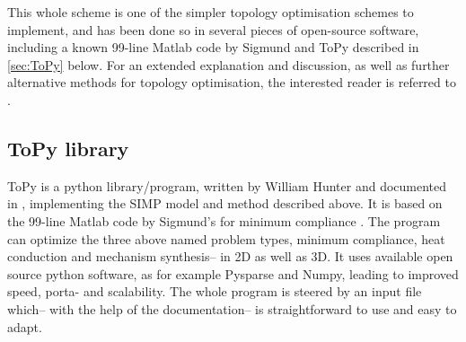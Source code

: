 This whole scheme is one of the simpler topology optimisation schemes to implement, and has been done so in several pieces of open-source software, including a known 99-line Matlab code by Sigmund \cite{sigmund200199}and ToPy described in \autoref{sec:ToPy} below. For an extended explanation and discussion, as well as further alternative methods for topology optimisation, the interested reader is referred to \cite{bendsoe2003topology}.



\subsection{ToPy library}\label{sec:ToPy}
ToPy \cite{ToPy} is a python library/program, written by William Hunter and documented in \cite{Hunter2009}, implementing the SIMP model and method described above. It is based on the 99-line Matlab code by Sigmund's for minimum compliance \cite{sigmund200199}. The program can optimize the three above named problem types, minimum compliance, heat conduction and mechanism synthesis-- in 2D as well as 3D. It uses available open source python software, as for example Pysparse and Numpy, leading to improved speed, porta- and scalability. The whole program is steered by an input file which-- with the help of the documentation-- is straightforward to use and easy to adapt. 

